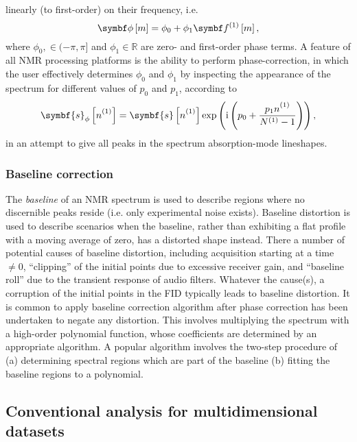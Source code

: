 linearly (to first-order) on their frequency, i.e.
\begin{equation}
    \bdphim = \phi_0 + \phi_1 \bdfonem,
\end{equation}
where $\phi_0, \in (-\pi, \pi]$ and $\phi_1 \in \mathbb{R}$ are zero- and
first-order phase terms. A feature of all \ac{NMR} processing platforms is the
ability to perform phase-correction, in which the user effectively determines
$\phi_0$ and $\phi_1$ by inspecting the appearance of the spectrum for
different values of $p_0$ and  $p_1$, according to
\begin{equation}
    \symbf{s}_{\phi} \left[\none\right] =
    \symbf{s} \left[\none\right]
    \exp\left(\iu \left(p_0 + \frac{p_1 \none}{\None - 1}\right)\right),
\end{equation}
in an attempt to give all peaks in the spectrum absorption-mode lineshapes.

\subsubsection{Baseline correction}
The \emph{baseline} of an \ac{NMR} spectrum is used to describe regions where
no discernible peaks reside (i.e. only experimental noise exists).
Baseline distortion is used to describe scenarios when the baseline, rather
than exhibiting a flat profile with a moving average of zero, has a distorted
shape instead. There a number of potential causes of baseline distortion,
including acquisition starting at a time $\neq 0$, ``clipping'' of the initial
points due to excessive receiver gain, and ``baseline roll'' due to the
transient response of audio filters\parencites[Section~3.3]{Cavanagh2007}{Tang1994}. Whatever
the cause(s), a corruption of
the initial points in the \ac{FID} typically leads to baseline distortion.
It is common to apply baseline correction algorithm after phase correction has
been undertaken to negate any distortion. This involves multiplying
the spectrum with a high-order polynomial function, whose coefficients are
determined by an appropriate algorithm. A popular algorithm
involves the two-step procedure of (a) determining spectral regions which are
part of the baseline (b) fitting the baseline regions to a
polynomial\cite{Dietrich1991,Cobas2006}.

\subsection{Conventional analysis for multidimensional datasets}

